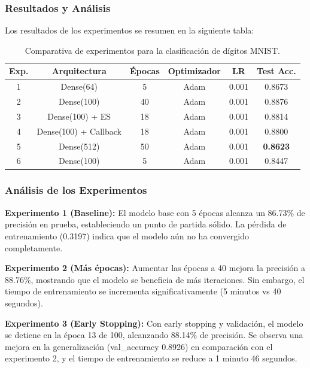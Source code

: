 \documentclass[12pt]{article}
\begin{document}
\subsubsection*{Resultados y Análisis}

Los resultados de los experimentos se resumen en la siguiente tabla:

\begin{table}[htbp]
\centering
\caption{Comparativa de experimentos para la clasificación de dígitos MNIST.}
\label{tab:mnist_experimentos}
\begin{tabular}{c c c c c c}
\toprule
\textbf{Exp.} & \textbf{Arquitectura} & \textbf{Épocas} & \textbf{Optimizador} & \textbf{LR} & \textbf{Test Acc.} \\
\midrule
1 & Dense(64) & 5 & Adam & 0.001 & 0.8673 \\
2 & Dense(100) & 40 & Adam & 0.001 & 0.8876 \\
3 & Dense(100) + ES & 18 & Adam & 0.001 & 0.8814 \\
4 & Dense(100) + Callback & 18 & Adam & 0.001 & 0.8800 \\
5 & Dense(512) & 50 & Adam & 0.001 & \textbf{0.8623} \\
6 & Dense(100) & 5 & Adam & 0.001 & 0.8447 \\
\bottomrule
\end{tabular}
\end{table}

\subsubsection*{Análisis de los Experimentos}

\textbf{Experimento 1 (Baseline):} El modelo base con 5 épocas alcanza un 86.73\% de precisión en prueba, estableciendo un punto de partida sólido. La pérdida de entrenamiento (0.3197) indica que el modelo aún no ha convergido completamente.

\textbf{Experimento 2 (Más épocas):} Aumentar las épocas a 40 mejora la precisión a 88.76\%, mostrando que el modelo se beneficia de más iteraciones. Sin embargo, el tiempo de entrenamiento se incrementa significativamente (5 minutos vs 40 segundos).

\textbf{Experimento 3 (Early Stopping):} Con early stopping y validación, el modelo se detiene en la época 13 de 100, alcanzando 88.14\% de precisión. Se observa una mejora en la generalización (val\_accuracy 0.8926) en comparación con el experimento 2, y el tiempo de entrenamiento se reduce a 1 minuto 46 segundos.
\end{document}
